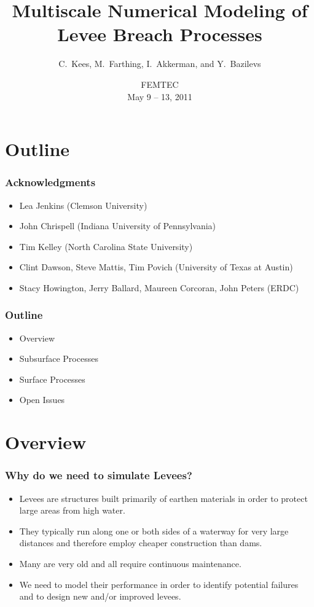 \documentclass{beamer}
\title[petsc4py]{Multiscale Numerical Modeling of Levee Breach Processes}
\author[C.~Kees \and M.~Farthing]%
{
  C.~Kees\inst{1}, M.~Farthing\inst{1}, I.~Akkerman\inst{1}\inst{,2}, and Y.~Bazilevs\inst{2}\\ 
  \email{chris.kees@us.army.mil} 
}
\institute[ERDC]
{
 \inst{1}Coastal and Hydraulics Laboratory\\
  US Army Engineer Research and Development Center\\
  Vicksburg, MS, USA\\[10pt]
 \inst{2}Department of Structural Engineering\\
  University of Caifornia\\
  San Diego, CA, USA
}
\date [FEMTEC '11]
{
  FEMTEC\\
  May 9 -- 13, 2011
}
\begin{document}
\begin{frame}
  \titlepage
\end{frame}

\section*{Outline}

\begin{frame}
\frametitle{Acknowledgments}
\begin{itemize}
\item Lea Jenkins (Clemson University)
\item John Chrispell (Indiana University of Pennsylvania)
\item Tim Kelley (North Carolina State University)
\item Clint Dawson, Steve Mattis, Tim Povich (University of Texas at Austin)
\item Stacy Howington, Jerry Ballard, Maureen Corcoran, John Peters (ERDC)
\end{itemize}
\end{frame}


\begin{frame}
  \frametitle{Outline}
  \begin{itemize}
    \item Overview
    \item Subsurface Processes
    \item Surface Processes
    \item Open Issues
  \end{itemize}
\end{frame}

\section{Overview}

\begin{frame}
  \frametitle{Why do we need to simulate Levees?}
  \begin{itemize}
  \item Levees are structures built primarily of earthen materials in order to
    protect large areas from high water.
  \item They typically run along one or both sides of a waterway for very
    large distances and therefore employ cheaper construction
    than dams.
  \item Many are very old and all require continuous maintenance.
  \item We need to model their performance in order to identify
    potential failures and to design new and/or improved levees.
  \end{itemize}
\end{frame}
\end{document}
